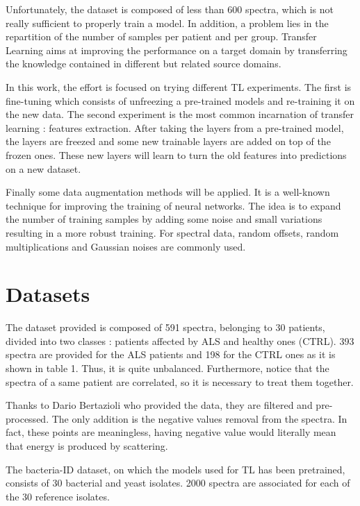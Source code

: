 Unfortunately, the dataset is composed of less than 600 spectra, which is not really sufficient to properly train a model. In addition, a problem lies in the repartition of the number of samples per patient and per group. Transfer Learning aims at improving the performance on a target domain by transferring the knowledge contained in different but related source domains.

In this work, the effort is focused on trying different TL experiments. The first is fine-tuning which consists of unfreezing a pre-trained models and re-training it on the new data. The second experiment is the most common incarnation of transfer learning : features extraction. After taking the layers from a pre-trained model, the layers are freezed and some new trainable layers are added on top of the frozen ones. These new layers will learn to turn the old features into predictions on a new dataset.

Finally some data augmentation methods will be applied. It is a well-known technique for improving the training of neural networks. The idea is to expand the number of training samples by adding some noise and small variations resulting in a more robust training. For spectral data, random offsets, random multiplications and Gaussian noises are commonly used.

\section{Datasets}
The dataset provided is composed of 591 spectra, belonging to 30 patients, divided into two classes : patients affected by ALS and healthy ones (CTRL). 393 spectra are provided for the ALS patients and 198 for the CTRL ones as it is shown in table 1. Thus, it is quite unbalanced. Furthermore, notice that the spectra of a same patient are correlated, so it is necessary to treat them together.

Thanks to Dario Bertazioli who provided the data, they are filtered and pre-processed. The only addition is the negative values removal from the spectra. In fact, these points are meaningless, having negative value would literally mean that energy is produced by scattering.

The bacteria-ID dataset, on which the models used for TL has been pretrained, consists of 30 bacterial and yeast isolates. 2000 spectra are associated for each of the 30 reference isolates. 


